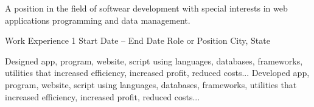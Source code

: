 \documentclass[9pt]{developercv} %
\begin{document}
\vspace{0.5cm}


\begin{minipage}[t]{0.4\textwidth} %

 A position in the field of softwear development with special interests in web applications programming and data management.
 
\end{minipage}
\hfill %
\begin{minipage}[t]{0.5\textwidth} %
	\vspace{-\baselineskip} %
	\begin{barchart}{5.5}
	\end{barchart}
\end{minipage}

\begin{center}
\end{center}


\begin{cvsubsection}
{Work Experience 1} {Start Date -- End Date}
{Role or Position} {City, State}

\listitem Designed app, program, website, script using languages, databases, frameworks, utilities that increased efficiency, increased profit, reduced costs...
\listitem Developed app, program, website, script using languages, databases, frameworks, utilities that increased efficiency, increased profit, reduced costs...

\end{cvsubsection}

\end{document}
